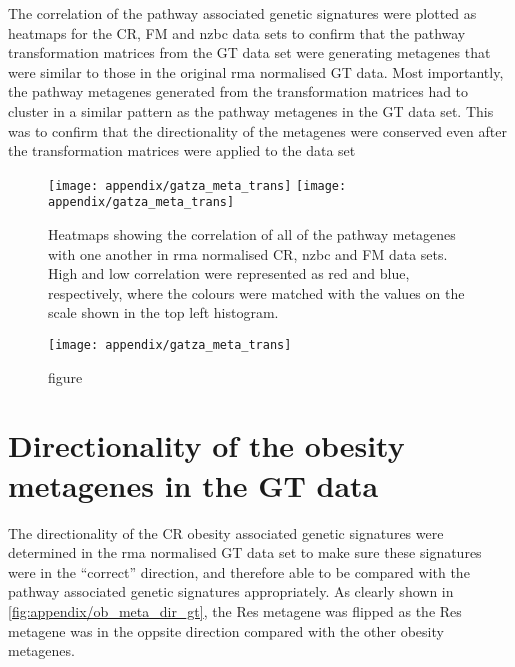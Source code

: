 \begin{appendices}
	The correlation of the pathway associated genetic signatures were plotted as heatmaps for the CR, FM and \gls{nzbc} data sets to confirm that the pathway transformation matrices from the GT data set were generating metagenes that were similar to those in the original \gls{rma} normalised GT data.
	Most importantly, the pathway metagenes generated from the transformation matrices had to cluster in a similar pattern as the pathway metagenes in the GT data set.
	This was to confirm that the directionality of the metagenes were conserved even after the transformation matrices were applied to the data set

	\begin{figure}[htp!]
		\centering
		\texttt{[image: appendix/gatza\_meta\_trans]}
		\texttt{[image: appendix/gatza\_meta\_trans]}
		\caption[Heatmaps of the Pearson correlation of all the pathway metagenes in the \gls{rma}-normalised CR, \gls{nzbc} and FM data]{Heatmaps showing the correlation of all of the pathway metagenes with one another in \gls{rma} normalised CR, \gls{nzbc} and FM data sets.
		High and low correlation were represented as red and blue, respectively, where the colours were matched with the values on the scale shown in the top left histogram.}
		\label{fig:appendix/gt_pathmeta_other_data}
	\end{figure}

	\begin{figure}[htpb]
		\ContinuedFloat
		\captionsetup{list=off,format=cont}
		\centering
		\texttt{[image: appendix/gatza\_meta\_trans]}
		\caption[]{figure}
	\end{figure}

	\section{Directionality of the obesity metagenes in the GT data}
	\label{sec:directionality_of_the_obesity_metagenes_in_the_gt_data}

	The directionality of the CR obesity associated genetic signatures were determined in the \gls{rma} normalised GT data set to make sure these signatures were in the ``correct'' direction, and therefore able to be compared with the pathway associated genetic signatures appropriately.
	As clearly shown in \cref{fig:appendix/ob_meta_dir_gt}, the Res metagene was flipped as the Res metagene was in the oppsite direction compared with the other obesity metagenes.


\end{appendices}
